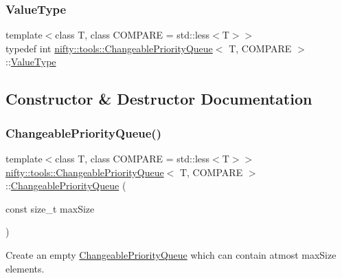 \subsubsection{\texorpdfstring{Value\+Type}{ValueType}}
{\footnotesize\ttfamily template$<$class T, class C\+O\+M\+P\+A\+RE = std\+::less$<$\+T$>$$>$ \\
typedef int \hyperlink{classnifty_1_1tools_1_1ChangeablePriorityQueue}{nifty\+::tools\+::\+Changeable\+Priority\+Queue}$<$ T, C\+O\+M\+P\+A\+RE $>$\+::\hyperlink{classnifty_1_1tools_1_1ChangeablePriorityQueue_a3b9e96ad70a62b02b4a117d58f758a1f}{Value\+Type}}



\subsection{Constructor \& Destructor Documentation}
\mbox{\label{classnifty_1_1tools_1_1ChangeablePriorityQueue_a5882abdd882fadd12ba20fd181b80c00}} 
\subsubsection{\texorpdfstring{Changeable\+Priority\+Queue()}{ChangeablePriorityQueue()}}
{\footnotesize\ttfamily template$<$class T, class C\+O\+M\+P\+A\+RE = std\+::less$<$\+T$>$$>$ \\
\hyperlink{classnifty_1_1tools_1_1ChangeablePriorityQueue}{nifty\+::tools\+::\+Changeable\+Priority\+Queue}$<$ T, C\+O\+M\+P\+A\+RE $>$\+::\hyperlink{classnifty_1_1tools_1_1ChangeablePriorityQueue}{Changeable\+Priority\+Queue} (\begin{DoxyParamCaption}\item[{const size\+\_\+t}]{max\+Size }\end{DoxyParamCaption})\hspace{0.3cm}{\ttfamily [inline]}}



Create an empty \hyperlink{classnifty_1_1tools_1_1ChangeablePriorityQueue}{Changeable\+Priority\+Queue} which can contain atmost max\+Size elements. 



